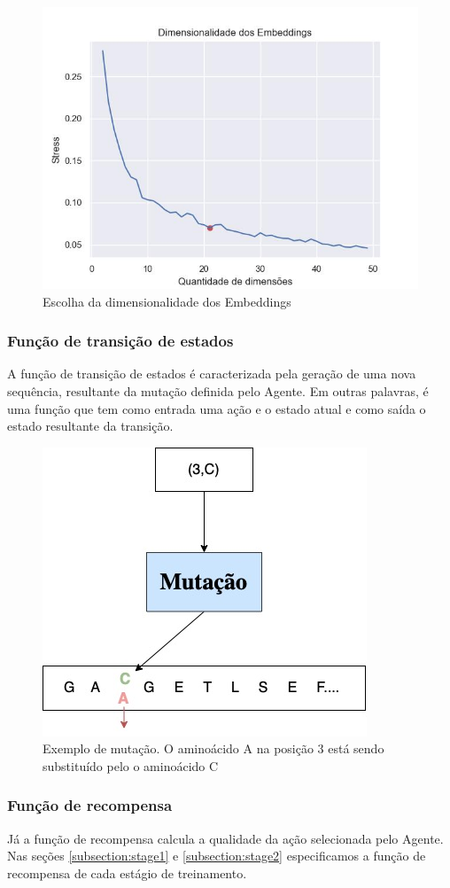 \begin{figure}[H]
  \centering
  \includegraphics[width=.8\textwidth]{figuras/best_dim.jpg}
  \caption{Escolha da dimensionalidade dos Embeddings}
  \label{fig:best_dim}
\end{figure}


\subsubsection{Função de transição de estados}
A função de transição de estados é caracterizada pela geração de uma nova sequência, 
resultante da mutação definida pelo Agente. 
Em outras palavras, é uma função que tem como entrada uma ação e o estado atual e como saída o estado resultante da transição. 

\begin{figure}[H]
  \centering
  \includegraphics[width=.5\textwidth]{figuras/metodologia-Mutation.jpg}
  \caption{Exemplo de mutação. O aminoácido A na posição 3 está sendo substituído pelo o aminoácido C}
  \label{fig:mutacao}
\end{figure}

\subsubsection{Função de recompensa}
Já a função de recompensa calcula a qualidade da ação selecionada pelo Agente. 
Nas seções \ref{subsection:stage1} e \ref{subsection:stage2} especificamos a função de recompensa de cada estágio de treinamento.


